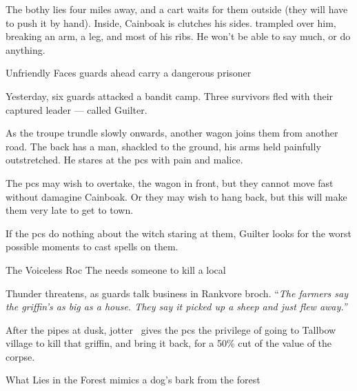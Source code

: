 \documentclass[10pt,twoside]{book}
\begin{document}
The \gls{bothy} lies four miles away, and a cart waits for them outside (they will have to push it by hand).
Inside, Cainboak is clutches his sides.
 trampled over him, breaking an arm, a leg, and most of his ribs.
He won't be able to say much, or do anything.

{Unfriendly Faces}%
{\Glspl{guard} ahead carry a dangerous prisoner}%

\begin{exampletext}
  Yesterday, six \glspl{guard} attacked a bandit camp.
  Three survivors fled with their captured leader ---  called Guilter.
\end{exampletext}

As the troupe trundle slowly onwards, another wagon joins them from another road.
The back has a man, shackled to the ground, his arms held painfully outstretched.
He stares at the \glspl{pc} with pain and malice.

The \glspl{pc} may wish to overtake, the wagon in front, but they cannot move fast without damagine Cainboak.
Or they may wish to hang back, but this will make them very late to get to town.


\showStdSpells

If the \glspl{pc} do nothing about the \gls{witch} staring at them, Guilter looks for the worst possible moments to cast spells on them.


{The Voiceless Roc}%
{The  needs someone to kill a local }%

Thunder threatens, as \glspl{guard} talk business in Rankvore \gls{broch}.
``\textit{The farmers say the \gls{griffin}'s as big as a house.
They say it picked up a sheep and just flew away.''}

After the pipes at dusk, \gls{jotter} \composeHumanName\ gives the \glspl{pc} the privilege of going to Tallbow \gls{village} to kill that \gls{griffin}, and bring it back, for a 50\% cut of the value of the corpse.


{What Lies in the Forest}%
{ mimics a dog's bark from the forest}%
\end{document}
